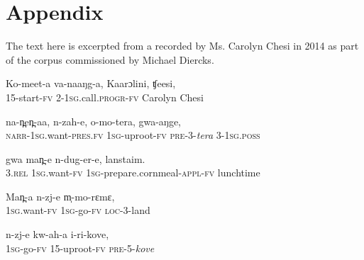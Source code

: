 \documentclass[output=paper]{LSP/langsci}
\begin{document}
\section*{Appendix}
\setcounter{equation}{0}
The text here is excerpted from a  recorded by Ms. Carolyn Chesi in 2014 as part of the  corpus commissioned by Michael Diercks.


 \begin{exe}
\ex \label{Saapp1}
\gll Ko-meet-a va-naaŋg-a, Kaarɔlini, ʧeesi,\\     	       
15-start-\textsc{fv}  2-\textsc{1sg}.call.\textsc{progr}-\textsc{fv}  Carolyn  Chesi \\
\glt {} 
\end{exe}

 \begin{exe}
\ex \label{Saapp2}
\gll na-n̪en̪-aa, n-zah-e, o-mo-tera, gwa-aŋge,\\
\textsc{narr}-\textsc{1sg}.want-\textsc{pres}.\textsc{fv}  \textsc{1sg}-uproot-\textsc{fv}  \textsc{pre}-3-\textit{tera}  3-\textsc{1sg}.\textsc{poss}\\
\glt {}
\end{exe}

 \begin{exe}
\ex \label{Saapp3}
\gll gwa man̪-e n-dug-er-e, lanstaim.\\
3.\textsc{rel}  \textsc{1sg}.want-\textsc{fv}  \textsc{1sg}-prepare.cornmeal-\textsc{appl}-\textsc{fv}  lunchtime\\
\glt {}
\end{exe}

 \begin{exe}
\ex \label{Saapp4}
\gll Man̪-a n-zj-e m̩-mo-rɛmɛ,\\
\textsc{1sg}.want-\textsc{fv}   \textsc{1sg}-go-\textsc{fv}   \textsc{loc}-3-land\\
\glt {}
\end{exe}

 \begin{exe}
\ex \label{Saapp5}
\gll n-zj-e kw-ah-a i-ri-kove,\\
\textsc{1sg}-go-\textsc{fv}   15-uproot-\textsc{fv}   \textsc{pre}-5-\textit{kove}\\
\glt {}
\end{exe}
\end{document}
